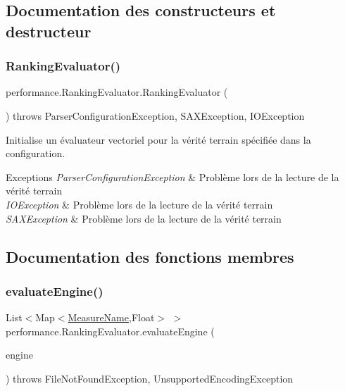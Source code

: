 \subsection{Documentation des constructeurs et destructeur}
\mbox{\label{classperformance_1_1RankingEvaluator_a2846c356fd89389971de6071fe9af1ff}} 
\subsubsection{\texorpdfstring{Ranking\+Evaluator()}{RankingEvaluator()}}
{\footnotesize\ttfamily performance.\+Ranking\+Evaluator.\+Ranking\+Evaluator (\begin{DoxyParamCaption}{ }\end{DoxyParamCaption}) throws Parser\+Configuration\+Exception, S\+A\+X\+Exception, I\+O\+Exception}

Initialise un évaluateur vectoriel pour la vérité terrain spécifiée dans la configuration.


\begin{DoxyExceptions}{Exceptions}
{\em Parser\+Configuration\+Exception} & Problème lors de la lecture de la vérité terrain \\
\hline
{\em I\+O\+Exception} & Problème lors de la lecture de la vérité terrain \\
\hline
{\em S\+A\+X\+Exception} & Problème lors de la lecture de la vérité terrain \\
\hline
\end{DoxyExceptions}


\subsection{Documentation des fonctions membres}
\mbox{\label{classperformance_1_1RankingEvaluator_a416bd329b92e6372d03d07246095303f}} 
\subsubsection{\texorpdfstring{evaluate\+Engine()}{evaluateEngine()}}
{\footnotesize\ttfamily List$<$Map$<$\hyperlink{enumperformance_1_1AbstractEvaluator_1_1MeasureName}{Measure\+Name},Float$>$ $>$ performance.\+Ranking\+Evaluator.\+evaluate\+Engine (\begin{DoxyParamCaption}\item[{\hyperlink{classquery_1_1RankingQueryEngine}{Ranking\+Query\+Engine}}]{engine }\end{DoxyParamCaption}) throws File\+Not\+Found\+Exception, Unsupported\+Encoding\+Exception}

